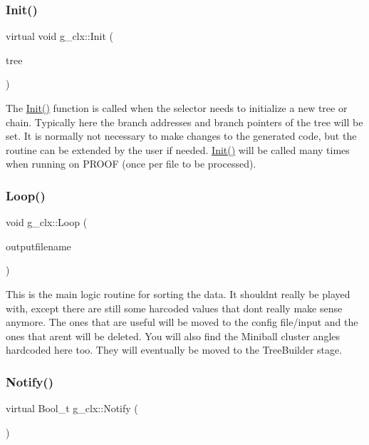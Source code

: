 \subsubsection{\texorpdfstring{Init()}{Init()}}
{\footnotesize\ttfamily virtual void g\+\_\+clx\+::\+Init (\begin{DoxyParamCaption}\item[{T\+Tree $\ast$}]{tree }\end{DoxyParamCaption})\hspace{0.3cm}{\ttfamily [virtual]}}

The \hyperlink{classg__clx_a92531261155ea15bee6b74c7e491132a}{Init()} function is called when the selector needs to initialize a new tree or chain. Typically here the branch addresses and branch pointers of the tree will be set. It is normally not necessary to make changes to the generated code, but the routine can be extended by the user if needed. \hyperlink{classg__clx_a92531261155ea15bee6b74c7e491132a}{Init()} will be called many times when running on P\+R\+O\+OF (once per file to be processed). \mbox{\label{classg__clx_a9d5de859df4bfbb746726661ff1d24a9}} 
\subsubsection{\texorpdfstring{Loop()}{Loop()}}
{\footnotesize\ttfamily void g\+\_\+clx\+::\+Loop (\begin{DoxyParamCaption}\item[{string}]{outputfilename }\end{DoxyParamCaption})\hspace{0.3cm}{\ttfamily [virtual]}}

This is the main logic routine for sorting the data. It shouldn\textquotesingle{}t really be played with, except there are still some harcoded values that don\textquotesingle{}t really make sense anymore. The ones that are useful will be moved to the config file/input and the ones that aren\textquotesingle{}t will be deleted. You will also find the Miniball cluster angles hardcoded here too. They will eventually be moved to the Tree\+Builder stage. \mbox{\label{classg__clx_a1fe81316168bc18dc2325ca5595577a9}} 
\subsubsection{\texorpdfstring{Notify()}{Notify()}}
{\footnotesize\ttfamily virtual Bool\+\_\+t g\+\_\+clx\+::\+Notify (\begin{DoxyParamCaption}{ }\end{DoxyParamCaption})\hspace{0.3cm}{\ttfamily [virtual]}}

